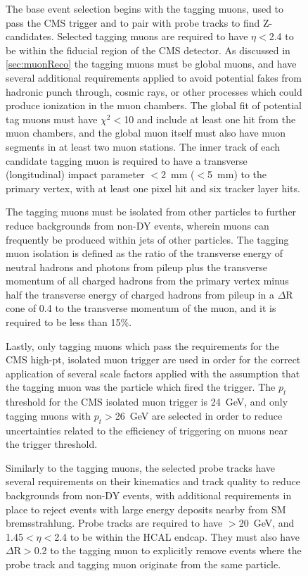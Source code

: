 \begin{figure}[htpb]
The base event selection begins with the tagging muons, used to pass the CMS trigger and to pair with probe tracks to find Z-candidates.
Selected tagging muons are required to have $\eta<$2.4 to be within the fiducial region of the CMS detector. 
As discussed in \cref{sec:muonReco} the tagging muons must be global muons, and have several additional requirements applied to avoid potential fakes from hadronic punch through, cosmic rays, or other processes which could produce ionization in the muon chambers.
The global fit of potential tag muons must have $\chi^2<$10 and include at least one hit from the muon chambers, and the global muon itself must also have muon segments in at least two muon stations.
The inner track of each candidate tagging muon is required to have a transverse (longitudinal) impact parameter $<$\SI{2}{\milli\meter} ($<$\SI{5}{\milli\meter}) to the primary vertex, with at least one pixel hit and six tracker layer hits.

The tagging muons must be isolated from other particles to further reduce backgrounds from non-DY events, wherein muons can frequently be produced within jets of other particles.
The tagging muon isolation is defined as the ratio of the transverse energy of neutral hadrons and photons from pileup plus the transverse momentum of all charged hadrons from the primary vertex minus half the transverse energy of charged hadrons from pileup in a $\Delta$R cone of 0.4 to the transverse momentum of the muon, and it is required to be less than 15$\%$.

Lastly, only tagging muons which pass the requirements for the CMS high-pt, isolated muon trigger are used in order for the correct application of several scale factors applied with the assumption that the tagging muon was the particle which fired the trigger.
The $p_t$ threshold for the CMS isolated muon trigger is \SI{24}{\giga\eV}, and only tagging muons with $p_t>$\SI{26}{\giga\eV} are selected in order to reduce uncertainties related to the efficiency of triggering on muons near the trigger threshold.

Similarly to the tagging muons, the selected probe tracks have several requirements on their kinematics and track quality to reduce backgrounds from non-DY events, with additional requirements in place to reject events with large energy deposits nearby from SM bremsstrahlung.
Probe tracks are required to have \pt$>$\SI{20}{\giga\eV}, and 1.45$<\eta<$2.4 to be within the HCAL endcap.
They must also have $\Delta\mathrm{R}>$0.2 to the tagging muon to explicitly remove events where the probe track and tagging muon originate from the same particle.


\end{figure}
